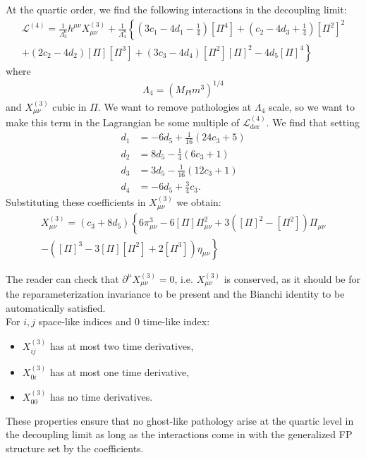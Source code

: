 \documentclass{book}
\theoremstyle{definition}
\newcommand{\p}{\partial}
\newcommand{\lag}{\mathcal{L}}
\newcommand{\nn}{\nonumber}
\newcommand{\f}[2]{\frac{#1}{#2}}
\newcommand{\lp}{\left(}
\newcommand{\rp}{\right)}
\newcommand{\lc}{\left\{}
\newcommand{\rc}{\right\}}
\begin{document}
At the quartic order, we find the following interactions in the decoupling limit:
\begin{align}
\lag^{(4)} = \f{1}{\Lambda^6_3}h^{\mu\nu}X_{\mu\nu}^{(3)} + \f{1}{\Lambda_4^8}\lc \lp 3c_1 - 4d_1 - \f{1}{4}\rp[\Pi^4] + \lp c_2  - 4d_3 + \f{1}{4}\rp[\Pi^2]^2    \right.\nn\\
\left. + (2c_2 - 4d_2)[\Pi][\Pi^3] + \lp 3c_3 - 4d_4 \rp[\Pi^2][\Pi]^2  - 4d_5[\Pi]^4     \rc
\end{align}
where
\begin{align}
\Lambda_4  = (M_{Pl}m^3)^{1/4}
\end{align}
and $X_{\mu\nu}^{(3)}$ cubic in $\Pi$. We want to remove pathologies at $\Lambda_4$ scale, so we want to make this term in the Lagrangian be some multiple of $\lag^{(4)}_\text{der}$. We find that setting
\begin{align}
d_1 &=  -6d_5 + \f{1}{16}(24c_3 + 5)\\
d_2 &=  8d_5 - \f{1}{4}(6c_3 + 1)\\
d_3 &=  3d_5 - \f{1}{16}(12c_3 + 1)\\
d_4 &=  -6d_5 + \f{3}{4}c_3.
\end{align}
Substituting these coefficients in $X_{\mu\nu}^{(3)}$ we obtain:
\begin{align}
X^{(3)}_{\mu\nu} = (c_3 + 8d_5)\lc 6\pi^3_{\mu\nu} - 6[\Pi]\Pi^2_{\mu\nu} + 3([\Pi]^2 - [\Pi^2])\Pi_{\mu\nu} \right.\nn\\
\left. -([\Pi]^3  - 3[\Pi][\Pi^2] + 2[\Pi^3])\eta_{\mu\nu}\rc
\end{align}

The reader can check that $\p^\mu X^{(3)}_{\mu\nu}  = 0$, i.e. $X_{\mu\nu}^{(3)}$ is conserved, as it should be for the reparameterization invariance to be present and the Bianchi identity to be automatically satisfied. \\

For $i,j$ space-like indices and $0$ time-like index:
\begin{itemize}
	\item $X_{ij}^{(3)}$ {has at most two time derivatives},
	\item $X_{0i}^{(3)}$ {has at most one time derivative},
	\item $X_{00}^{(3)}$ {has no time derivatives}.
\end{itemize}

These properties ensure that no ghost-like pathology arise at the quartic level in the decoupling limit as long as the interactions come in with the generalized FP structure set by the coefficients.
\end{document}

